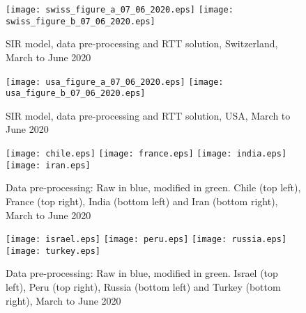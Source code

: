 \documentclass{article}
\begin{document}
\begin{figure}
\begin{center}
{\texttt{[image: swiss\_figure\_a\_07\_06\_2020.eps]}}
\qquad
{\texttt{[image: swiss\_figure\_b\_07\_06\_2020.eps]}}
\end{center}
\begin{center}
\caption{SIR model, data pre-processing and RTT solution, Switzerland, March to June 2020
}
\label{fig:swiss_sir_model_07_06_2020}
\end{center}
\end{figure}

\begin{figure}
\begin{center}
{\texttt{[image: usa\_figure\_a\_07\_06\_2020.eps]}}
\qquad
{\texttt{[image: usa\_figure\_b\_07\_06\_2020.eps]}}
\end{center}
\begin{center}
\caption{SIR model, data pre-processing and RTT solution, USA, March to June 2020
}
\label{fig:usa_sir_model_07_06_2020}
\end{center}
\end{figure}



\begin{figure}[H]
\begin{center}
{\texttt{[image: chile.eps]}}
\qquad
{\texttt{[image: france.eps]}}
\qquad
{\texttt{[image: india.eps]}}
\qquad
{\texttt{[image: iran.eps]}}
\end{center}
\begin{center}
\caption{Data pre-processing: Raw in blue, modified in green. Chile (top left), France (top right), India (bottom left) and Iran (bottom right), March to June 2020
}
\label{fig:chile_france_india_iran_07_06_2020}
\end{center}
\end{figure}

\begin{figure}[H]
    \begin{center}
        {\texttt{[image: israel.eps]}}
        \qquad
        {\texttt{[image: peru.eps]}}
        \qquad
    {\texttt{[image: russia.eps]}}
    \qquad
    {\texttt{[image: turkey.eps]}}
    \end{center}
    \begin{center}
    \caption{Data pre-processing: Raw in blue, modified in green. Israel (top left), Peru (top right), Russia (bottom left) and Turkey (bottom right), March to June 2020
    }
\label{fig:israel_peru_russia_turkey_07_06_2020}
    \end{center}
\end{figure}
\end{document}
